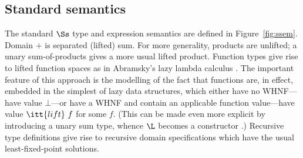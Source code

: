 \documentclass[11pt]{article}
\begin{document}

\subsection{Standard semantics}

The standard $\Ss$ type and expression semantics are defined in
Figure~\ref{fig:ssem}.  
Domain $\plus$ is separated (lifted) sum.  
For more generality, products are unlifted; a unary sum-of-products gives a
more usual lifted product.  
Function types give rise to lifted function
spaces as in Abramsky's lazy lambda calculus \cite{Abr89}.
The important feature of this approach is the modelling of the
fact that functions are, in effect, embedded in the simplest of
lazy data structures, which either have no WHNF---have value $\bot$---or
have a WHNF and contain an applicable function value---have value
$\itt{lift}~f$ for some $f$.  (This can be made even more explicit by
introducing a unary sum type, whence ${\it \L}$ becomes a constructor \cite{Dav94}.)
Recursive type definitions give rise to recursive domain
specifications which have the usual least-fixed-point solutions.
\end{document}
